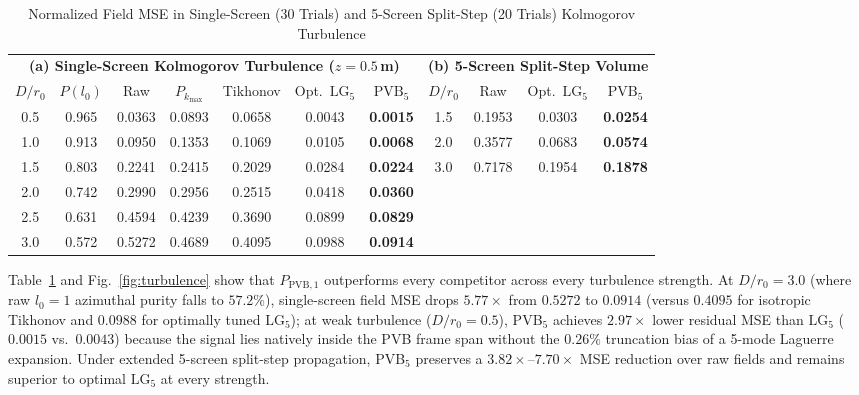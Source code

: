 \documentclass{optica-article}
\begin{document}
\begin{table}[htbp]
  \centering
  \caption{Normalized Field MSE in Single-Screen (30 Trials) and 5-Screen Split-Step (20 Trials) Kolmogorov Turbulence}
  \label{tab:turbulence}
  \scriptsize
  \renewcommand{\arraystretch}{1.14}
  \begin{tabular}{@{}ccccccc@{\hspace{1.2em}}cccc@{}}
  \toprule
  \multicolumn{7}{c}{\textbf{(a) Single-Screen Kolmogorov Turbulence ($z = 0.5\,$m)}} & \multicolumn{4}{c}{\textbf{(b) 5-Screen Split-Step Volume}} \\
  \cmidrule(r){1-7}\cmidrule(l){8-11}
  $D/r_0$ & $P(l_0)$ & Raw & $P_{k_{\max}}$ & Tikhonov & Opt.\ $\mathrm{LG}_5$ & $\mathrm{PVB}_5$ & $D/r_0$ & Raw & Opt.\ $\mathrm{LG}_5$ & $\mathrm{PVB}_5$ \\
  \midrule
  0.5 & 0.965 & 0.0363 & 0.0893 & 0.0658 & 0.0043 & \textbf{0.0015} & 1.5 & 0.1953 & 0.0303 & \textbf{0.0254} \\
  1.0 & 0.913 & 0.0950 & 0.1353 & 0.1069 & 0.0105 & \textbf{0.0068} & 2.0 & 0.3577 & 0.0683 & \textbf{0.0574} \\
  1.5 & 0.803 & 0.2241 & 0.2415 & 0.2029 & 0.0284 & \textbf{0.0224} & 3.0 & 0.7178 & 0.1954 & \textbf{0.1878} \\
  2.0 & 0.742 & 0.2990 & 0.2956 & 0.2515 & 0.0418 & \textbf{0.0360} & & & & \\
  2.5 & 0.631 & 0.4594 & 0.4239 & 0.3690 & 0.0899 & \textbf{0.0829} & & & & \\
  3.0 & 0.572 & 0.5272 & 0.4689 & 0.4095 & 0.0988 & \textbf{0.0914} & & & & \\
  \bottomrule
  \end{tabular}
\end{table}

Table~\ref{tab:turbulence} and Fig.~\ref{fig:turbulence} show that $P_{\mathrm{PVB},1}$ outperforms every competitor across every turbulence strength. At $D/r_0 = 3.0$ (where raw $l_0 = 1$ azimuthal purity falls to $57.2\%$), single-screen field MSE drops $5.77\times$ from $0.5272$ to $0.0914$ (versus $0.4095$ for isotropic Tikhonov and $0.0988$ for optimally tuned $\mathrm{LG}_5$); at weak turbulence ($D/r_0 = 0.5$), PVB$_5$ achieves $2.97\times$ lower residual MSE than $\mathrm{LG}_5$ ($0.0015$ vs.\ $0.0043$) because the signal lies natively inside the PVB frame span without the $0.26\%$ truncation bias of a 5-mode Laguerre expansion. Under extended 5-screen split-step propagation, PVB$_5$ preserves a $3.82\times\text{--}7.70\times$ MSE reduction over raw fields and remains superior to optimal $\mathrm{LG}_5$ at every strength.
\end{document}
